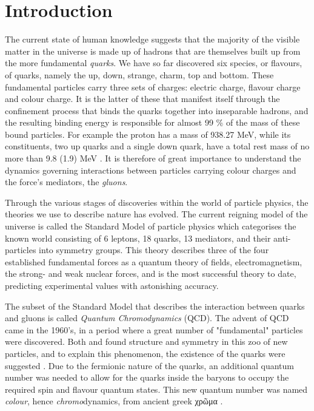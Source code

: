 \chapter{Introduction}

The current state of human knowledge suggests that the majority of the visible
matter in the universe is made up of hadrons that are themselves built up from
the more fundamental \emph{quarks}. We have so far discovered six species, or
flavours, of quarks, namely the up, down, strange, charm, top and bottom. These
fundamental particles carry three sets of charges: electric charge, flavour
charge and colour charge. It is the latter of these that manifest itself
through the confinement process that binds the quarks together into inseparable
hadrons, and the resulting binding energy is responsible for almost 99 \% of the
mass of these bound particles. For example the proton has a mass of 938.27 MeV,
while its constituents, two up quarks and a single down quark, have a total rest
mass of no more than 9.8 (1.9) MeV \citep{Agashe:2014kda}. It is therefore of
great importance to understand the dynamics governing interactions between
particles carrying colour charges and the force's mediators, the \emph{gluons}. 

Through the various stages of discoveries within the world of particle physics,
the theories we use to describe nature has evolved. The current reigning model
of the universe is called the Standard Model of particle physics which
categorises the known world consisting of 6 leptons, 18 quarks, 13 mediators,
and their anti-particles into symmetry groups. This theory describes three of
the four established fundamental forces as a quantum theory of fields,
electromagnetism, the strong- and weak nuclear forces, and is
the most successful theory to date, predicting experimental values with
astonishing accuracy.

The subset of the Standard Model that describes the interaction between quarks
and gluons is called \emph{Quantum Chromodynamics} (QCD). The advent of QCD came
in the 1960's, in a period where a great number of "fundamental" particles were 
discovered. Both \cite{GellMann:1962xb} and \cite{Ne'eman:1961cd} found
structure and symmetry in this zoo of new particles, and to explain this
phenomenon, the existence of the quarks were suggested \citep{GellMann:1964nj}.
Due to the fermionic nature of the quarks, an additional quantum number was
needed to allow for the quarks inside the baryons to occupy the required spin
and flavour quantum states. This new quantum number was named \emph{colour},
hence \emph{chromo}dynamics, from ancient greek χρῶμα \citep{Greenberg:1964pe}.

